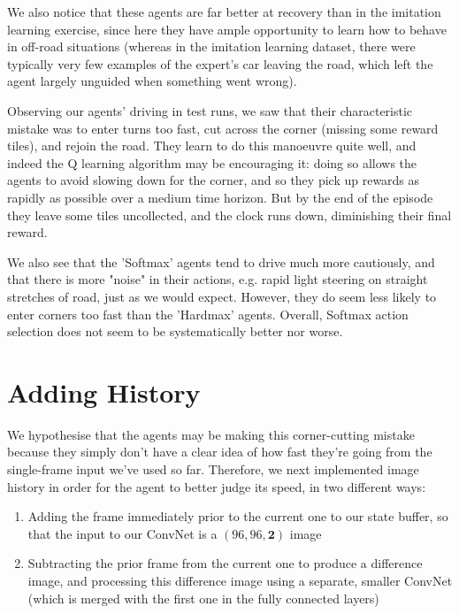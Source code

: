 \documentclass[a4paper, 11pt, conference]{ieeeconf}      %
\begin{document}
We also notice that these agents are far better at recovery than in the imitation learning exercise, since here they have ample opportunity to learn how to behave in off-road situations (whereas in the imitation learning dataset, there were typically very few examples of the expert's car leaving the road, which left the agent largely unguided when something went wrong).

Observing our agents' driving in test runs, we saw that their characteristic mistake was to enter turns too fast, cut across the corner (missing some reward tiles), and rejoin the road. They learn to do this manoeuvre quite well, and indeed the Q learning algorithm may be encouraging it: doing so allows the agents to avoid slowing down for the corner, and so they pick up rewards as rapidly as possible over a medium time horizon. But by the end of the episode they leave some tiles uncollected, and the clock runs down, diminishing their final reward.

We also see that the 'Softmax' agents tend to drive much more cautiously, and that there is more "noise" in their actions, e.g. rapid light steering on straight stretches of road, just as we would expect. However, they do seem less likely to enter corners too fast than the 'Hardmax' agents. Overall, Softmax action selection does not seem to be systematically better nor worse.

\section{Adding History}

We hypothesise that the agents may be making this corner-cutting mistake because they simply don't have a clear idea of how fast they're going from the single-frame input we've used so far. Therefore, we next implemented image history in order for the agent to better judge its speed, in two different ways:

\begin{enumerate}
	\item Adding the frame immediately prior to the current one to our state buffer, so that the input to our ConvNet is a $(96, 96, \textbf{2})$ image

	\item Subtracting the prior frame from the current one to produce a difference image, and processing this difference image using a separate, smaller ConvNet (which is merged with the first one in the fully connected layers)
\end{enumerate}
\end{document}
